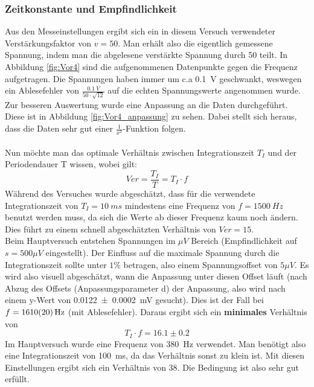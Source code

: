 \documentclass[12pt,a4paper]{article}
\begin{document}
\subsubsection{Zeitkonstante und Empfindlichkeit}
\label{kap.vor4}
Aus den Messeinstellungen ergibt sich ein in diesem Versuch verwendeter Verstärkungsfaktor von $v = 50$. Man erhält also die eigentlich gemessene Spannung, indem man die abgelesene verstärkte Spannung durch 50 teilt. In Abbildung \ref{fig:Vor4} sind die aufgenommenen Datenpunkte gegen die Frequenz aufgetragen. Die Spannungen haben immer um c.a \SI{0,1}{V} geschwankt, weswegen ein Ablesefehler von $\frac{\SI{0,1}{V}}{50 \cdot \sqrt{12}}$ auf die echten Spannungswerte angenommen wurde.\\
Zur besseren Auswertung wurde eine Anpassung an die Daten durchgeführt. Diese ist in Abbildung \ref{fig:Vor4_anpassung} zu sehen. Dabei stellt sich heraus, dass die Daten sehr gut einer $\frac{1}{x^2}$-Funktion folgen.\\
\\
Nun möchte man das optimale Verhältnis zwischen Integrationszeit $T_I$ und der Periodendauer T wissen, wobei gilt:
\begin{equation*}
Ver = \dfrac{T_I}{T} = T_I \cdot f
\end{equation*}
Während des Versuches wurde abgeschätzt, dass für die verwendete Integrationszeit von $T_I = \SI{10}{ms}$ mindestens eine Frequenz von $f = \SI{1500}{Hz}$ benutzt werden muss, da sich die Werte ab dieser Frequenz kaum noch ändern. Dies führt zu einem schnell abgeschätzten Verhältnis von $Ver = 15$.\\
Beim Hauptversuch entstehen Spannungen im $\si{\mu V}$ Bereich (Empfindlichkeit auf $s = 500\mu V$ eingestellt). Der Einfluss auf die maximale Spannung durch die Integrationszeit sollte unter $1\%$ betragen, also einem Spannungsoffset von $5\mu V$. Es wird also visuell abgeschätzt, wann die Anpassung unter diesen Offset läuft (nach Abzug des Offsets (Anpassungsparameter d) der Anpassung, also wird nach einem y-Wert von \SI{0.0122\pm 0.0002}{mV} gesucht).  Dies ist der Fall bei $f = \SI{1610\pm 20}{Hz}$ (mit Ablesefehler). Daraus ergibt sich ein \textbf{minimales} Verhältnis von
\begin{equation*}
\boxed{T_I \cdot f = 16.1\pm 0.2}
\end{equation*}
Im Hauptversuch wurde eine Frequenz von \SI{380}{Hz} verwendet. Man benötigt also eine Integrationszeit von \SI{100}{ms}, da das Verhältnis sonst zu klein ist. Mit diesen Einstellungen ergibt sich ein Verhältnis von $38$. Die Bedingung ist also sehr gut erfüllt.
\end{document}
